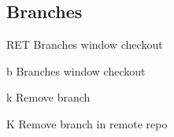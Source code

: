 \documentclass[11pt,a4paper]{article}
\begin{document}
\begin{multicols}{2}
\section{Branches}
\begin{eqlist}
\item[RET] Branches window checkout
\item[b] Branches window checkout 
\item[k] Remove branch
\item[K] Remove branch in remote repo 

\end{eqlist}

\end{multicols}
\end{document}
